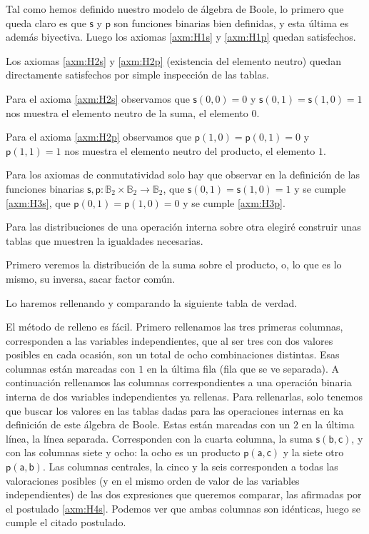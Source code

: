 \documentclass[final,12pt,a4paper,twoside,fleqn]{extbook}
\newcommand{\fromto}{\ensuremath{\longrightarrow}}
\newcommand{\bfs}[1]{\ensuremath{\boldsymbol{#1}}}
\newcommand{\funcsum}{\ensuremath{\bfs{\mathsf{s}}}}
\newcommand{\funcsumat}[2]{\ensuremath{\funcsum\left({#1,#2}\right)}}
\newcommand{\funcprod}{\ensuremath{\bfs{\mathsf{p}}}}
\newcommand{\funcprodat}[2]{\ensuremath{\funcprod\left({#1,#2}\right)}}
\newcommand{\setB}{\ensuremath{\mathbb{B}}}
\theoremstyle{definition}
\theoremstyle{remark}
\begin{document}
	Tal como hemos definido nuestro modelo de álgebra de Boole, lo primero
que queda claro es que \(\funcsum\) y \(\funcprod\) son funciones binarias
bien definidas, y esta última es además biyectiva. Luego los axiomas
\ref{axm:H1s} y \ref{axm:H1p} quedan satisfechos. 



	Los axiomas \ref{axm:H2s} y \ref{axm:H2p} (existencia del elemento
neutro) quedan directamente satisfechos por simple inspección de las tablas. 



	Para el axioma \ref{axm:H2s} observamos que \(\funcsumat{0}{0} = 0\) y
\(\funcsumat{0}{1} = \funcsumat{1}{0} = 1\) nos muestra el elemento neutro de
la suma, el elemento \(0\).



	Para el axioma \ref{axm:H2p} observamos que \( \funcprodat{1}{0} =
\funcprodat{0}{1} = 0\) y \(\funcprodat{1}{1} = 1\) nos muestra el elemento
neutro del producto, el elemento \(1\).



	Para los axiomas de conmutatividad solo hay que observar en la definición
de las funciones binarias \(\funcsum,\funcprod : \setB_2 \times \setB_2
\fromto \setB_2\), que \(\funcsumat{0}{1} = \funcsumat{1}{0} = 1\) y se
cumple \ref{axm:H3s}, que \(\funcprodat{0}{1} = \funcprodat{1}{0} = 0\) y se
cumple \ref{axm:H3p}. 



	Para las distribuciones de una operación interna sobre otra elegiré
construir unas tablas que muestren la igualdades necesarias.



	Primero veremos la distribución de la suma sobre el producto, o, lo que
es lo mismo, su inversa, sacar factor común. 



	Lo haremos rellenando y comparando la siguiente tabla de verdad.



	El método de relleno es fácil. Primero rellenamos las tres primeras
columnas, corresponden a las variables independientes, que al ser tres con
dos valores posibles en cada ocasión, son un total de ocho combinaciones
distintas. Esas columnas están marcadas con \(1\) en la última fila (fila que
se ve separada). A continuación rellenamos las columnas correspondientes a
una operación binaria interna de dos variables independientes ya rellenas.
Para rellenarlas, solo tenemos que buscar los valores en las tablas dadas
para las operaciones internas en ka definición de este álgebra de Boole.
Estas están marcadas con un \(2\) en la última línea, la línea separada.
Corresponden con la cuarta columna, la suma \( \funcsumat{ \textsf{b} } {
\textsf{c} } \), y con las columnas siete y ocho: la ocho es un producto
\(\funcprodat{\textsf{a}}{\textsf{c}}\) y la siete otro \( \funcprodat{
\textsf{a} } { \textsf{b} } \). Las columnas centrales, la cinco y la seis
corresponden a todas las valoraciones posibles (y en el mismo orden de valor
de las variables independientes) de las dos expresiones que queremos
comparar, las afirmadas por el postulado \ref{axm:H4s}. Podemos ver que ambas
columnas son idénticas, luego se cumple el citado postulado.
\end{document}
